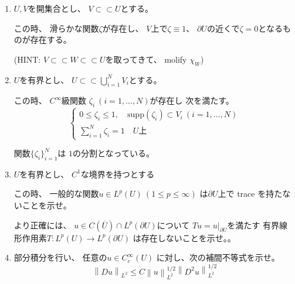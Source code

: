 \documentclass[12pt,b5paper]{ltjsarticle}
\begin{document}
\begin{enumerate}
\begin{enumerate}
            \dotfill


            \hrulefill

      \end{enumerate}
 \item
      $U,V$を開集合とし、
      $V\subset\subset U$とする。

      この時、
      滑らかな関数$\zeta$が存在し、
      $V$上で$\zeta\equiv 1$、
      $\partial U$の近くで$\zeta = 0$となるものが存在する。

      (HINT: $V \subset\subset W \subset\subset U$を取ってきて、
      molify $\chi_{W}$)
      
      \dotfill


      \hrulefill
 \item
      $U$を有界とし、
      $U \subset\subset \bigcup_{i=1}^{N}V_{i}$とする。

      この時、
      $C^{\infty}$級関数
      $\zeta_{i} \: (i=1,\dots,N)$が存在し
      次を満たす。
      \begin{equation}
       \begin{cases}
        0\leq \zeta_{i} \leq 1
        , \quad
        \mathrm{supp}(\zeta_{i}) \subset V_{i} \: (i=1,\ldots,N)\\
        \sum_{i=1}^{N}\zeta_{i} = 1 \quad U\text{上}
       \end{cases}
      \end{equation}

      関数$\{\zeta_{i}\}_{i=1}^{N}$は
      $1$の分割となっている。

      \dotfill


      \hrulefill
 \item
      $U$を有界とし、
      $C^{1}$な境界を持つとする

      この時、
      一般的な関数$u \in L^{p}(U) \: (1\leq p \leq \infty)$
      は$\partial U$上で trace を持たないことを示せ。

      より正確には、
      $u\in C(\overline{U})\cap L^{p}(\partial U)$について
      $Tu = u|_{\partial U}$を満たす
      有界線形作用素$T:L^{p}(U) \to L^{p}(\partial U)$
      は存在しないことを示せ。。

      \dotfill


      \hrulefill
 \item
      部分積分を行い、
      任意の$u\in C^{\infty}_{c}(U)$
      に対し、次の補間不等式を示せ。
      \begin{equation}
       \left\| Du \right\|_{L^{2}}
        \leq
        C \left\| u \right\|_{L^{2}}^{1/2}
        \left\| D^{2}u \right\|_{L^{2}}^{1/2}
      \end{equation}


\end{enumerate}
\end{document}
